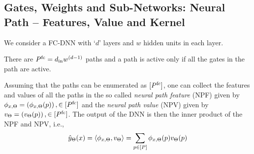 \subsection{Gates, Weights and Sub-Networks: Neural Path -- Features, Value and Kernel}
We consider a FC-DNN with `$d$' layers and  $w$  hidden units in each layer. 
There are $P^{\text{fc}}=d_{\text{in}} w^{(d-1)}$ paths and a path is active only if all the gates in the path are active.
\begin{proposition}\label{prop:npf-npv}
 Assuming that the paths can be enumerated as $[P^{\text{fc}}]$, one can collect the features and values of all the paths in the so called \emph{neural path feature} (NPF) given by $\phi_{x,\Theta}=\left(\phi_{x,\Theta}(p)\right),\in[P^{\text{fc}}]$ and the \emph{neural path value} (NPV) given by $v_{\Theta}=\left(v_{\Theta}(p)\right),\in[P^{\text{fc}}]$. The output of the DNN is then the inner product of the NPF and NPV, i.e., 
\begin{align}\label{eq:inner}
\hat{y}_{\Theta}(x)=\langle \phi_{x,\Theta},v_{\Theta}\rangle=\sum_{p\in[P]}  \phi_{x,\Theta}(p) v_{\Theta}(p)
\end{align}
\end{proposition}
